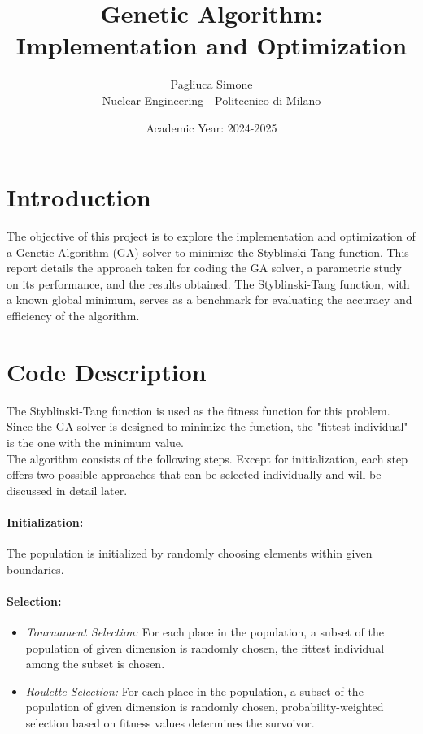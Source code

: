 \documentclass[11pt,a4paper,twoside]{article}
\title{\textbf{\color{cherenkovblue}Genetic Algorithm: \\ Implementation and Optimization}}
\author{Pagliuca Simone \\ Nuclear Engineering - Politecnico di Milano}
\date{Academic Year: 2024-2025}
\begin{document}
\maketitle

\section{Introduction}
The objective of this project is to explore the implementation and optimization of a Genetic Algorithm (GA) solver to minimize the Styblinski-Tang function. This report details the approach taken for coding the GA solver, a parametric study on its performance, and the results obtained. The Styblinski-Tang function, with a known global minimum, serves as a benchmark for evaluating the accuracy and efficiency of the algorithm.

\section{Code Description}
The Styblinski-Tang function is used as the fitness function for this problem. Since the GA solver is designed to minimize the function, the "fittest individual" is the one with the minimum value. \\

The algorithm consists of the following steps. Except for initialization, each step offers two possible approaches that can be selected individually and will be discussed in detail later.

    \paragraph{Initialization:} The population is initialized by randomly choosing elements within given boundaries.
    \paragraph{Selection:}
    \begin{itemize}
        \item \textit{Tournament Selection:} For each place in the population, a subset of the population of given dimension is randomly chosen, the fittest individual among the subset is chosen.
        \item \textit{Roulette Selection:} For each place in the population,  a subset of the population of given dimension is randomly chosen, probability-weighted selection based on fitness values determines the survoivor.
    \end{itemize}
\end{document}

